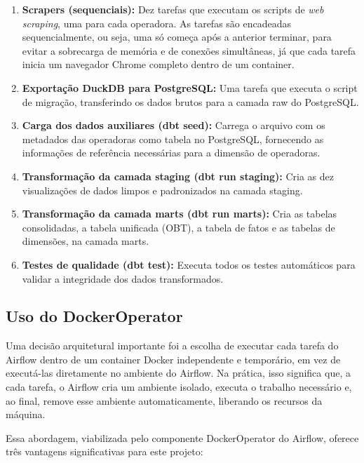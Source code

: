 \begin{enumerate}
    \item \textbf{Scrapers (sequenciais):} Dez tarefas que executam os scripts de \textit{web scraping}, uma para cada operadora. As tarefas são encadeadas sequencialmente, ou seja, uma só começa após a anterior terminar, para evitar a sobrecarga de memória e de conexões simultâneas, já que cada tarefa inicia um navegador Chrome completo dentro de um container.
    \item \textbf{Exportação DuckDB para PostgreSQL:} Uma tarefa que executa o script de migração, transferindo os dados brutos para a camada raw do PostgreSQL.
    \item \textbf{Carga dos dados auxiliares (dbt seed):} Carrega o arquivo com os metadados das operadoras como tabela no PostgreSQL, fornecendo as informações de referência necessárias para a dimensão de operadoras.
    \item \textbf{Transformação da camada staging (dbt run staging):} Cria as dez visualizações de dados limpos e padronizados na camada staging.
    \item \textbf{Transformação da camada marts (dbt run marts):} Cria as tabelas consolidadas, a tabela unificada (OBT), a tabela de fatos e as tabelas de dimensões, na camada marts.
    \item \textbf{Testes de qualidade (dbt test):} Executa todos os testes automáticos para validar a integridade dos dados transformados.
\end{enumerate}

\subsection{Uso do DockerOperator}

Uma decisão arquitetural importante foi a escolha de executar cada tarefa do Airflow dentro de um container Docker independente e temporário, em vez de executá-las diretamente no ambiente do Airflow. Na prática, isso significa que, a cada tarefa, o Airflow cria um ambiente isolado, executa o trabalho necessário e, ao final, remove esse ambiente automaticamente, liberando os recursos da máquina.

Essa abordagem, viabilizada pelo componente DockerOperator do Airflow, oferece três vantagens significativas para este projeto:


